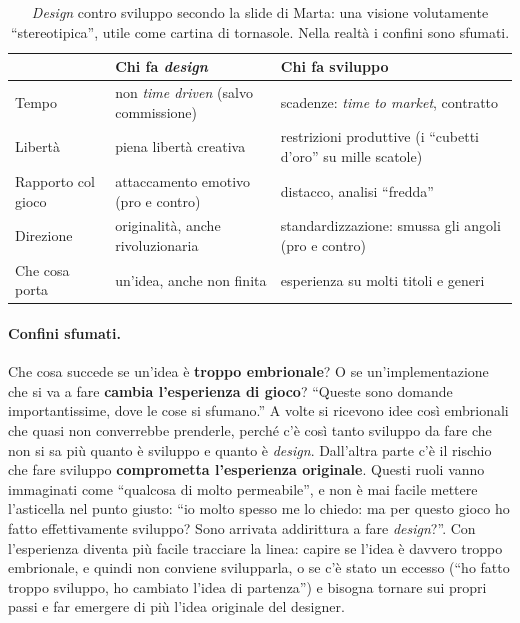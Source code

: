 \begin{table}[htbp]
\centering
\small
\begin{tabular}{@{}p{3.0cm}p{5.0cm}p{5.4cm}@{}}
\toprule
 & \textbf{Chi fa \emph{design}} & \textbf{Chi fa sviluppo} \\
\midrule
Tempo & non \emph{time driven} (salvo commissione) & scadenze: \emph{time to market},
  contratto \\
Libertà & piena libertà creativa & restrizioni produttive (i ``cubetti d'oro'' su mille
  scatole) \\
Rapporto col gioco & attaccamento emotivo (pro e contro) & distacco, analisi ``fredda'' \\
Direzione & originalità, anche rivoluzionaria & standardizzazione: smussa gli angoli
  (pro e contro) \\
Che cosa porta & un'idea, anche non finita & esperienza su molti titoli e generi \\
\bottomrule
\end{tabular}
\caption{\emph{Design} contro sviluppo secondo la slide di Marta: una visione volutamente
``stereotipica'', utile come cartina di tornasole. Nella realtà i confini sono sfumati.}
\label{a13:tab:designvs}
\end{table}

\paragraph{Confini sfumati.} Che cosa succede se un'idea è \textbf{troppo embrionale}? O se
un'implementazione che si va a fare \textbf{cambia l'esperienza di gioco}? ``Queste sono
domande importantissime, dove le cose si sfumano.'' A volte si ricevono idee così
embrionali che quasi non converrebbe prenderle, perché c'è così tanto sviluppo da fare
che non si sa più quanto è sviluppo e quanto è \emph{design}. Dall'altra parte c'è il
rischio che fare sviluppo \textbf{comprometta l'esperienza originale}. Questi ruoli vanno
immaginati come ``qualcosa di molto permeabile'', e non è mai facile mettere l'asticella
nel punto giusto: ``io molto spesso me lo chiedo: ma per questo gioco ho fatto
effettivamente sviluppo? Sono arrivata addirittura a fare \emph{design}?''. Con
l'esperienza diventa più facile tracciare la linea: capire se l'idea è davvero troppo
embrionale, e quindi non conviene svilupparla, o se c'è stato un eccesso (``ho fatto
troppo sviluppo, ho cambiato l'idea di partenza'') e bisogna tornare sui propri passi e
far emergere di più l'idea originale del designer.

